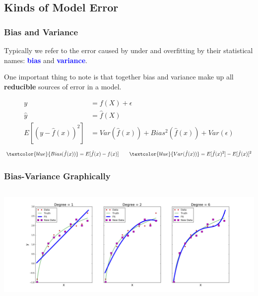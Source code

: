 \documentclass{beamer}
\begin{document}
\subsection{Kinds of Model Error}
\begin{frame}
  \frametitle{Bias and Variance}
  Typically we refer to the error caused by under and overfitting by their statistical names: \textbf{\textcolor{blue}{bias}} and \textbf{\textcolor{blue}{variance}}. \vspace{4mm} \pause

  One important thing to note is that together bias and variance make up all \textbf{reducible} sources of error in a model. \vspace{2mm} \pause

  \begin{align*}
    y &= f(X) + \epsilon \\
    \hat{y} &= \hat{f}(X) \\
    E[(y - \hat{f}(x))^2] &= Var(\hat{f}(x)) + Bias^2(\hat{f}(x)) + Var(\epsilon)
  \end{align*}
  $$ \textcolor{blue}{Bias(\hat{f}(x))} = E[\hat{f}(x) - f(x)] \qquad \textcolor{blue}{Var(\hat{f}(x))} = E[\hat{f}(x)^2] - E[\hat{f}(x)]^2 $$
\end{frame}

\begin{frame}
  \frametitle{Bias-Variance Graphically}
  \begin{columns}
    \begin{center}
      \includegraphics[width=\textwidth]{images/overfitting_new_data.png}
    \end{center}
  \end{columns}
\end{frame}
\end{document}
